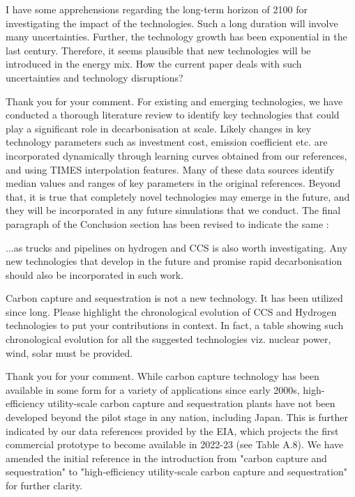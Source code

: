 \documentclass[answers,11pt]{exam}
\begin{document}
\begin{questions}

        \question I have some apprehensions regarding the long-term horizon of 2100 for investigating the impact of the technologies. Such a long duration will involve many uncertainties. Further, the technology growth has been exponential in the last century. Therefore, it seems plausible that new technologies will be introduced in the energy mix. How the current paper deals with such uncertainties and technology disruptions?
        
        \begin{solution}
                 Thank you for your comment. For existing and emerging technologies, we have conducted a thorough literature review to identify key technologies that could play a significant role in decarbonisation at scale. Likely changes in key technology parameters such as investment cost, emission coefficient etc. are incorporated dynamically through learning curves obtained from our references, and using TIMES interpolation features. Many of these data sources identify median values and ranges of key parameters in the original references. Beyond that, it is true that completely novel technologies may emerge in the future, and they will be incorporated in any future simulations that we conduct. The final paragraph of the Conclusion section has been revised to indicate the same :
                 
                 ...as trucks and pipelines on hydrogen and CCS is also worth investigating. Any new technologies that develop in the future and promise rapid decarbonisation should also be incorporated in such work.
                 
                 
        \end{solution}
        
                \question Carbon capture and sequestration is not a new technology. It has been utilized since long. Please highlight the chronological evolution of CCS and Hydrogen technologies to put your contributions in context. In fact, a table showing such chronological evolution for all the suggested technologies viz. nuclear power, wind, solar must be provided. 
        
        \begin{solution}
                 Thank you for your comment. While carbon capture technology has been available in some form for a variety of applications since early 2000s, high-efficiency utility-scale carbon capture and sequestration plants have not been developed beyond the pilot stage in any nation, including Japan. This is further indicated by our data references provided by the EIA, which projects the first commercial prototype to become available in 2022-23 (see Table A.8). We have amended the initial reference in the introduction from "carbon capture and sequestration" to "high-efficiency utility-scale carbon capture and sequestration" for further clarity.
                 

\end{solution}
\end{questions}
\end{document}
